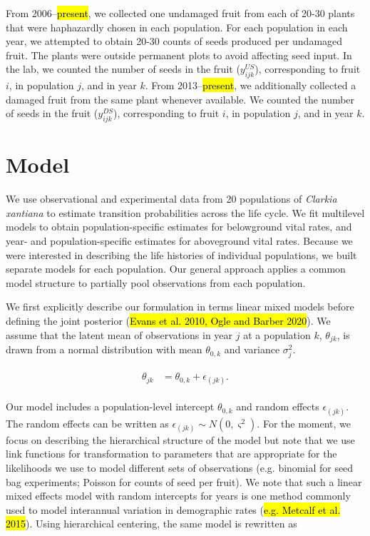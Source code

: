 \documentclass[12pt, oneside, titlepage]{article}   	%
\begin{document}
From 2006--\hl{present}, we collected one undamaged fruit from each of 20-30 plants that were haphazardly chosen in each population. For each population in each year, we attempted to obtain 20-30 counts of seeds produced per undamaged fruit. The plants were outside permanent plots to avoid affecting seed input. In the lab, we counted the number of seeds in the fruit ($y^{US}_{ijk}$), corresponding to fruit $i$, in population $j$, and in year $k$. From 2013--\hl{present}, we additionally collected a damaged fruit from the same plant whenever available. We counted the number of seeds in the fruit ($y^{DS}_{ijk}$), corresponding to fruit $i$, in population $j$, and in year $k$.

\section{Model}

We use observational and experimental data from 20 populations of \textit{Clarkia xantiana} to estimate transition probabilities across the life cycle. We fit multilevel models to obtain population-specific estimates for belowground vital rates, and year- and population-specific estimates for aboveground vital rates. Because we were interested in describing the life histories of individual populations, we built separate models for each population. Our general approach applies a common model structure to partially pool observations from each population. 

We first explicitly describe our formulation in terms linear mixed models before defining the joint posterior (\hl{Evans et al. 2010, Ogle and Barber 2020}). We assume that the latent mean of observations in year $j$ at a population $k$, $\theta_{jk}$, is drawn from a normal distribution with mean $\theta_{0,k}$ and variance $\sigma^2_j$.

\begin{align}
  \begin{split}
  \theta_{jk} &  = \theta_{0,k} +\epsilon_{(jk)}.
  \end{split}
\end{align}

Our model includes a population-level intercept $\theta_{0,k}$ and random effects $\epsilon_{(jk)}$. The random effects can be written as  $\epsilon_{(jk)}\sim N(0, \varsigma^2)$. For the moment, we focus on describing the hierarchical structure of the model but note that we use link functions for transformation to parameters that are appropriate for the likelihoods we use to model different sets of observations (e.g. binomial for seed bag experiments; Poisson for counts of seed per fruit). We note that such a linear mixed effects model with random intercepts for years is one method commonly used to model interannual variation in demographic rates (\hl{e.g. Metcalf et al. 2015}). Using hierarchical centering, the same model is rewritten as 
\end{document}
